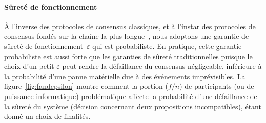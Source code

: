 \documentclass[a4,twocolumn,10pt]{article}
\theoremstyle{definition}
\begin{document}
\paragraph{Sûreté de fonctionnement} À l'inverse des protocoles de consensus classiques, et à l'instar des protocoles de consensus fondés sur la chaîne la plus longue~\cite{nakamoto2008bitcoin}, nous adoptons une garantie de sûreté de fonctionnement~$\varepsilon$ qui est probabiliste.
En pratique, cette garantie probabiliste est aussi forte que les garanties de sûreté traditionnelles puisque le choix d'un petit $\varepsilon$ peut rendre la défaillance du consensus négligeable, inférieure à la probabilité d'une panne matérielle due à des événements imprévisibles.
La figure~\ref{fig:fandepsilon} montre comment la portion ($f/n$) de participants (ou de puissance informatique) problématique affecte la probabilité d'une défaillance de la sûreté du système (décision concernant deux propositions incompatibles), étant donné un choix de finalités.
\end{document}
